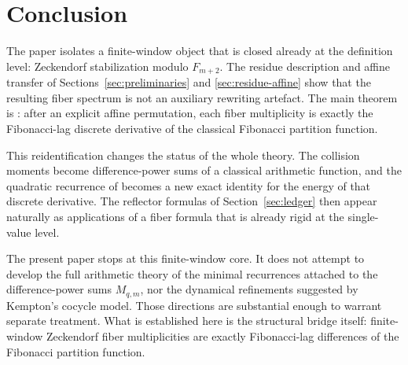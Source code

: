 \section{Conclusion}\label{sec:conclusion}

The paper isolates a finite-window object that is closed already at the
definition level: Zeckendorf stabilization modulo \(F_{m+2}\).  The residue
description and affine transfer of Sections~\ref{sec:preliminaries} and
\ref{sec:residue-affine} show that the resulting fiber spectrum is not an
auxiliary rewriting artefact.  The main theorem is
: after an explicit affine permutation, each
fiber multiplicity is exactly the Fibonacci-lag discrete derivative of the
classical Fibonacci partition function.

This reidentification changes the status of the whole theory.  The collision
moments become difference-power sums of a classical arithmetic function, and
the quadratic recurrence of  becomes a new exact
identity for the energy of that discrete derivative.  The reflector formulas of
Section~\ref{sec:ledger} then appear naturally as applications of a fiber
formula that is already rigid at the single-value level.

The present paper stops at this finite-window core.  It does not attempt to
develop the full arithmetic theory of the minimal recurrences attached to the
difference-power sums \(M_{q,m}\), nor the dynamical refinements suggested by
Kempton's cocycle model.  Those directions are substantial enough to warrant
separate treatment.  What is established here is the structural bridge itself:
finite-window Zeckendorf fiber multiplicities are exactly Fibonacci-lag
differences of the Fibonacci partition function.
